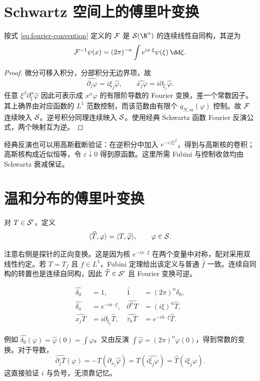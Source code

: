 \section{Schwartz 空间上的傅里叶变换}
\begin{theorem}\label{thm:schwartz-fourier}
按式 \eqref{eq:fourier-convention} 定义的 $\mathcal{F}$ 是 $\Sch(\R^n)$ 的连续线性自同构，其逆为
\[
 \FT^{-1}\psi(x)=(2\pi)^{-n}\int e^{ix\cdot\xi}\psi(\xi)\,\dd\xi.
\]
\end{theorem}
\begin{proof}
微分可移入积分，分部积分无边界项，故
\begin{equation}\label{eq:fourier-identities}
 \widehat{\partial_j\varphi}=i\xi_j\widehat\varphi,
 \qquad\widehat{x_j\varphi}=i\partial_{\xi_j}\widehat\varphi.
\end{equation}
任意 $\xi^\beta\partial_\xi^\alpha\widehat\varphi$ 因此可表示成 $x^\alpha\varphi$ 的有限阶导数的 Fourier 变换，差一个常数因子。其上确界由对应函数的 $L^1$ 范数控制，而该范数由有限个 $q_{N,m}(\varphi)$ 控制。故 $\mathcal{F}$ 连续映入 $\mathcal{S}$。逆号积分同理连续映入 $\mathcal{S}$。使用经典 Schwartz 函数 Fourier 反演公式，两个映射互为逆。
\end{proof}
经典反演也可以用高斯截断验证：在逆积分中加入 $e^{-\varepsilon|\xi|^2}$，得到与高斯核的卷积；高斯核构成近似恒等，令 $\varepsilon\downarrow0$ 得到原函数。这里所需 Fubini 与控制收敛均由 Schwartz 衰减保证。

\section{温和分布的傅里叶变换}
\begin{definition}[对偶定义]
对 $T\in\mathcal{S}'$，定义
\begin{equation}\label{eq:fourier-distribution}
 \langle \widehat T,\varphi\rangle=\langle T,\widehat\varphi\rangle,\qquad\varphi\in\mathcal{S}.
\end{equation}
\end{definition}
注意右侧是探针的正向变换。这是因为核 $e^{-ix\cdot\xi}$ 在两个变量中对称，配对采用双线性约定。若 $T=T_f$ 且 $f\in L^1$，Fubini 定理给出该定义与普通 $\widehat f$ 一致。连续自同构的转置也是连续自同构，因此 $\widehat T\in\mathcal{S}'$ 且 Fourier 变换可逆。
\begin{keyformula}[常数与基本对象]
\begin{align*}
 \widehat{\delta_0}&=1,&\widehat1&=(2\pi)^n\delta_0,\\
 \widehat{\delta_a}&=e^{-ia\cdot\xi},&
 \widehat{\partial^\alpha T}&=(i\xi)^\alpha\widehat T,\\
 \widehat{x_jT}&=i\partial_{\xi_j}\widehat T,&
 \widehat{\tau_hT}&=e^{-ih\cdot\xi}\widehat T.
\end{align*}
\end{keyformula}
例如 $\widehat{\delta_0}(\varphi)=\widehat\varphi(0)=\int\varphi$。又由反演 $\int\widehat\varphi=(2\pi)^n\varphi(0)$，得到常数的变换。对于导数，
\[
 \widehat{\partial_jT}(\varphi)
 =-T(\partial_{x_j}\widehat\varphi)
 =T(\widehat{i\xi_j\varphi})
 =\widehat T(i\xi_j\varphi).
\]
这直接验证 $i$ 与负号，无须靠记忆。


